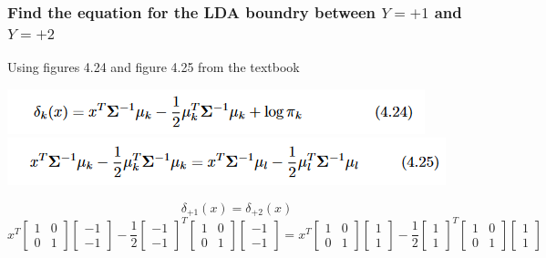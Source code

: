 \documentclass[12pt]{article}
\begin{document}
\subsubsection{Find the equation for the LDA boundry between $Y = +1$ and $Y = +2$}
Using figures 4.24 and figure 4.25 from the textbook\\
\begin{center}
    \includegraphics{fig4.24.png}\\
    \includegraphics{fig4.25.png}
\end{center}
\[
    \delta_{+1}(x) = \delta_{+2}(x)
\]
\[
    x^T\begin{bmatrix} 1 & 0\\ 0 & 1\end{bmatrix}\begin{bmatrix} -1 \\ -1\end{bmatrix} - \frac{1}{2}\begin{bmatrix} -1 \\ -1\end{bmatrix}^T\begin{bmatrix} 1 & 0\\ 0 & 1\end{bmatrix}\begin{bmatrix} -1 \\ -1\end{bmatrix}
    =
    x^T\begin{bmatrix} 1 & 0\\ 0 & 1\end{bmatrix}\begin{bmatrix} 1 \\ 1\end{bmatrix} - \frac{1}{2}\begin{bmatrix} 1 \\ 1\end{bmatrix}^T\begin{bmatrix} 1 & 0\\ 0 & 1\end{bmatrix}\begin{bmatrix} 1 \\ 1\end{bmatrix}
\]
\end{document}
